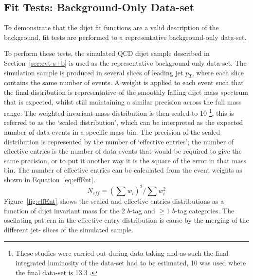 \subsection{Fit Tests: Background-Only Data-set}
\label{sec:bkg-summer_fitCR}

To demonstrate that the dijet fit functions are a valid description of the background,
fit tests are performed to a representative background-only data-set.

To perform these tests, the simulated QCD dijet sample described in Section~\ref{sec:evt-s+b} is used as the representative background-only data-set.
The simulation sample is produced in several slices of leading jet $p_{T}$, where each slice contains the same number of events.
A weight is applied to each event such that the final distribution is representative of the smoothly falling dijet mass spectrum that is expected,
whilst still maintaining a similar precision across the full mass range.
The weighted invariant mass distribution is then scaled to 10 \ifb{} \footnote{
  These studies were carried out during data-taking
  and as such the final integrated luminosity of the data-set had to be estimated,
  10 \ifb{} was used where the final data-set is 13.3 \ifb{}.
},
this is referred to as the  `scaled distribution', which can be interpreted as the expected number of data events in a specific mass bin. 
The precision of the scaled distribution is represented by the number of `effective entries';
the number of effective entries is the number of data events that would be required to give the same precision,
or to put it another way it is the square of the error in that mass bin. The number of effective entries can be calculated from the event weights as shown in Equation~\ref{eq:effEnt}.
\begin{equation}
  N_{eff} = (\sum{w_i})^2 / \sum{w_i^2}
  \label{eq:effEnt}
\end{equation}
Figure~\ref{fig:effEnt} shows the scaled and effective entries distributions as a function of dijet invariant mass for the 2 $b$-tag and $\geq$1 $b$-tag categories.
The oscilating pattern in the effective entry distribution is cause by the merging of the different jet-\pT{} slices of the simulated sample. 

